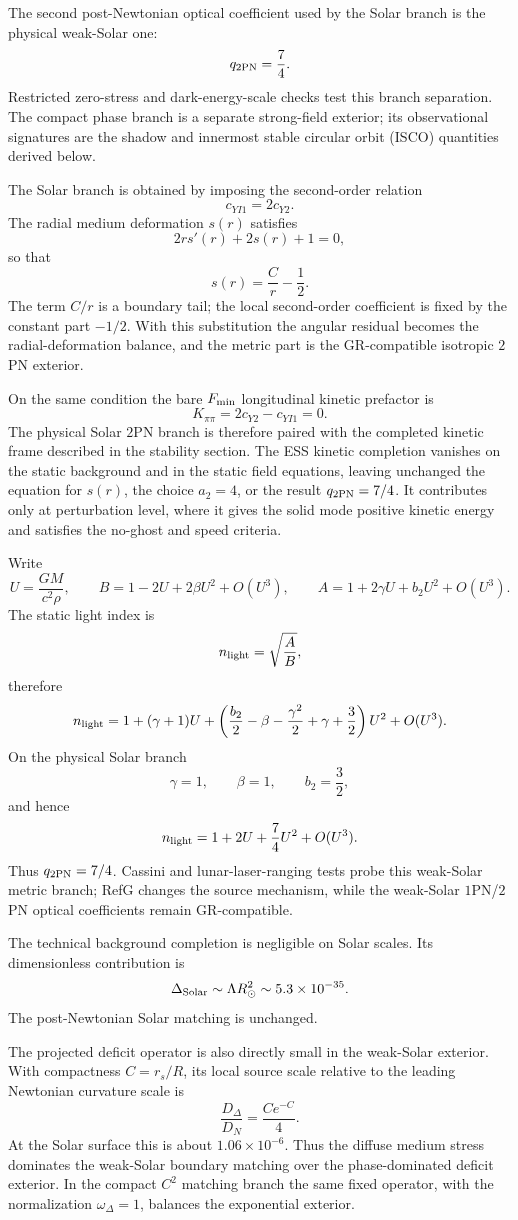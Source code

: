 \documentclass[12pt,a4paper]{article}
\begin{document}
The second post-Newtonian optical coefficient used by the Solar branch is the physical weak-Solar one:
\[
q_{2{\rm PN}}=\frac{7}{4}.
\]
Restricted zero-stress and dark-energy-scale checks test this branch separation. The compact phase branch is a separate strong-field exterior; its observational signatures are the shadow and innermost stable circular orbit (ISCO) quantities derived below.

The Solar branch is obtained by imposing the second-order relation
\[
c_{YI1}=2c_{Y2}.
\]
The radial medium deformation $s(r)$ satisfies
\[
2rs'(r)+2s(r)+1=0,
\]
so that
\[
s(r)=\frac{C}{r}-\frac12.
\]
The term $C/r$ is a boundary tail; the local second-order coefficient is fixed by the constant part $-1/2$. With this substitution the angular residual becomes the radial-deformation balance, and the metric part is the GR-compatible isotropic $2$PN exterior.

On the same condition the bare $F_{\rm min}$ longitudinal kinetic prefactor is
\[
K_{\pi\pi}=2c_{Y2}-c_{YI1}=0.
\]
The physical Solar $2$PN branch is therefore paired with the completed kinetic
frame described in the stability section. The ESS kinetic completion vanishes
on the static background and in the static field equations, leaving unchanged
the equation for $s(r)$, the choice $a_2=4$, or the result
$q_{2{\rm PN}}=7/4$. It contributes only at perturbation level, where it gives
the solid mode positive kinetic energy and satisfies the no-ghost and speed criteria.

Write
\[
U=\frac{GM}{c^2\rho},
\qquad
B=1-2U+2\beta U^2+O(U^3),
\qquad
A=1+2\gamma U+b_2U^2+O(U^3).
\]
The static light index is
\[
n_{\rm light}=\sqrt{\frac{A}{B}},
\]
therefore
\[
n_{\rm light}=1+(\gamma+1)U+
\left(\frac{b_2}{2}-\beta-\frac{\gamma^2}{2}
+\gamma+\frac32\right)U^2+O(U^3).
\]
On the physical Solar branch
\[
\gamma=1,\qquad \beta=1,\qquad b_2=\frac32,
\]
and hence
\[
n_{\rm light}=1+2U+\frac74U^2+O(U^3).
\]
Thus $q_{2{\rm PN}}=7/4$. Cassini and lunar-laser-ranging tests probe this weak-Solar metric branch; RefG changes the source mechanism, while the weak-Solar $1$PN/$2$PN optical coefficients remain GR-compatible.

The technical background completion is negligible on Solar scales. Its dimensionless contribution is
\[
\Delta_{\rm Solar}\sim \Lambda R_\odot^2\sim 5.3\times10^{-35}.
\]
The post-Newtonian Solar matching is unchanged.

The projected deficit operator is also directly small in the weak-Solar
exterior. With compactness $C=r_s/R$, its local source scale relative to the
leading Newtonian curvature scale is
\[
\frac{D_\Delta}{D_N}=\frac{C e^{-C}}{4}.
\]
At the Solar surface this is about $1.06\times10^{-6}$. Thus the diffuse
medium stress dominates the weak-Solar boundary matching over the
phase-dominated deficit exterior. In the compact $C^2$ matching branch the same
fixed operator, with the normalization $\omega_\Delta=1$, balances the
exponential exterior.
\end{document}
